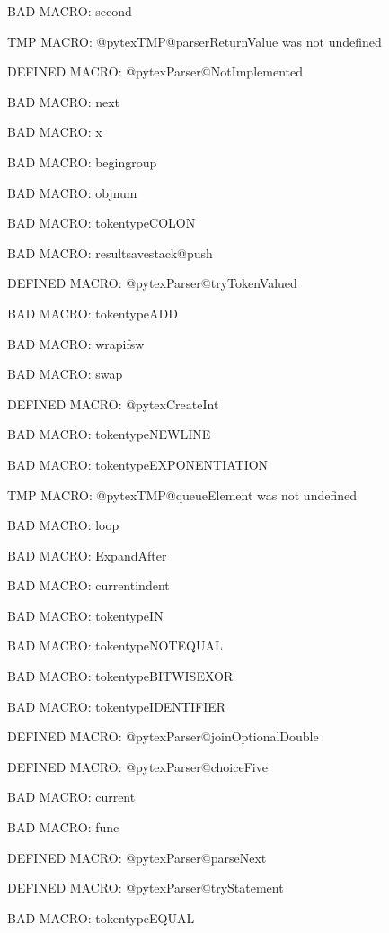 BAD MACRO: second

\ifx\@pytexTMP@parserReturnValue\undefined\else TMP MACRO: @pytexTMP@parserReturnValue was not undefined
\fi

\ifx\@pytexParser@NotImplemented\undefined\else DEFINED MACRO: @pytexParser@NotImplemented
\fi

BAD MACRO: next

BAD MACRO: x

BAD MACRO: begingroup

BAD MACRO: objnum

BAD MACRO: tokentypeCOLON

BAD MACRO: resultsavestack@push

\ifx\@pytexParser@tryTokenValued\undefined\else DEFINED MACRO: @pytexParser@tryTokenValued
\fi

BAD MACRO: tokentypeADD

BAD MACRO: wrapifsw

BAD MACRO: swap

\ifx\@pytexCreateInt\undefined\else DEFINED MACRO: @pytexCreateInt
\fi

BAD MACRO: tokentypeNEWLINE

BAD MACRO: tokentypeEXPONENTIATION

\ifx\@pytexTMP@queueElement\undefined\else TMP MACRO: @pytexTMP@queueElement was not undefined
\fi

BAD MACRO: loop

BAD MACRO: ExpandAfter

BAD MACRO: currentindent

BAD MACRO: tokentypeIN

BAD MACRO: tokentypeNOTEQUAL

BAD MACRO: tokentypeBITWISEXOR

BAD MACRO: tokentypeIDENTIFIER

\ifx\@pytexParser@joinOptionalDouble\undefined\else DEFINED MACRO: @pytexParser@joinOptionalDouble
\fi

\ifx\@pytexParser@choiceFive\undefined\else DEFINED MACRO: @pytexParser@choiceFive
\fi

BAD MACRO: current

BAD MACRO: func

\ifx\@pytexParser@parseNext\undefined\else DEFINED MACRO: @pytexParser@parseNext
\fi

\ifx\@pytexParser@tryStatement\undefined\else DEFINED MACRO: @pytexParser@tryStatement
\fi

BAD MACRO: tokentypeEQUAL

